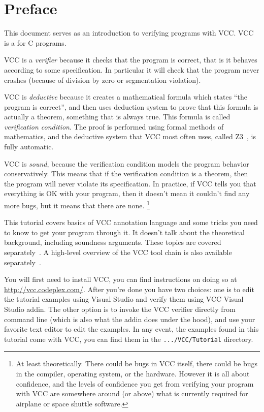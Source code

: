 \section{Preface}

This document serves as an introduction to verifying programs with VCC.
VCC is a  for C programs.

VCC is a \emph{verifier} because it checks that the program is correct, that is it behaves according to
some specification.
In particular it will check that the program never crashes (because of division
by zero or segmentation violation).

VCC is \emph{deductive} because it creates a mathematical formula which
states ``the program is correct'', and then uses deduction system
to prove that this formula is actually a theorem, something that is always true.
This formula is called \emph{verification condition}.
The proof is performed using formal methods of mathematics,
and the deductive system that VCC most often uses, called Z3~\cite{z3},
is fully automatic.

VCC is \emph{sound}, because the verification condition models the program behavior conservatively.
This means that if the verification condition is a theorem, then the program will never
violate its specification.
In practice, if VCC tells you that everything is OK with your program,
then it doesn't mean it couldn't find any more bugs, but it means that there are none.%
\footnote{
  At least theoretically.
  There could be bugs in VCC itself, there could be bugs in the compiler, operating system, or the hardware.
  However it is all about confidence, and the levels of confidence you get from verifying your program with
  VCC are somewhere around (or above) what is currently required for airplane or space shuttle software.
}

This tutorial covers basics of VCC annotation language and some tricks you
need to know to get your program through it. 
It doesn't talk about the theoretical background, including soundness
arguments.
These topics are covered separately~\cite{lci}.
A high-level overview
of the VCC tool chain is also available separately~\cite{Cohen:TPHOLs2009-23}.

You will first need to install VCC, you can find instructions on doing so at \url{http://vcc.codeplex.com/}.
After you're done you have two choices: one is to edit the tutorial examples
using Visual Studio and verify them using VCC Visual Studio addin.
The other option is to invoke the VCC verifier directly from command line
(which is also what the addin does under the hood),
and use your favorite text editor to edit the examples.
In any event, the examples found in this tutorial come with VCC, you
can find them in the \texttt{.../VCC/Tutorial} directory.
